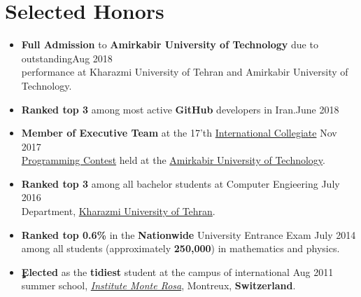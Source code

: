 \documentclass[letterpaper,11pt]{article}
\newcommand{\resumeSubHeadingListStart}{\begin{itemize}[leftmargin=*]}
\newcommand{\resumeSubHeadingListEnd}{\end{itemize}}
\begin{document}

\section{Selected Honors}
 \resumeSubHeadingListStart
 \vspace{0.1cm}
  \item{
  	\textbf{Full Admission} to 
  	\textbf{Amirkabir University of Technology}
  	due to outstanding\hfill {Aug 2018}\\ performance at Kharazmi University of Tehran and Amirkabir University of Technology.
  }
 
 \item{
	\textbf{Ranked top 3} among most active \textbf{GitHub} developers in Iran.\hfill{June 2018}
 }
 \item{
	\textbf{Member of Executive Team}
	at the 17'th \href{https://icpc.baylor.edu/regionals/finder/tehran-2017}{International Collegiate} \hfill {Nov 2017}\\  \href{https://icpc.baylor.edu/regionals/finder/tehran-2017}{Programming Contest} held at the \href{http://ceit.aut.ac.ir}{Amirkabir University of Technology}.

 }
 
 \item{
	\textbf{Ranked top 3}
	among all bachelor students at Computer Engieering \hfill {July 2016}\\ Department, \href{http://khu.ac.ir}{Kharazmi University of Tehran}.
 }
 
 \item{
 	\textbf{Ranked top 0.6\%}
 	in the \textbf{Nationwide} University Entrance Exam \hfill {July 2014}\\ among all students (approximately \textbf{250,000}) in 
 	mathematics and physics.
 		
 }
 
 \item{
	\textbf{ٍElected}
	as the \textbf{tidiest} student at the campus of international \hfill {Aug 2011}\\ summer school, \textit{\href{https://www.monterosa.ch/}{Institute Monte Rosa}}, Montreux, \textbf{Switzerland}. 
 	
 }
 \resumeSubHeadingListEnd
	
\end{document}
